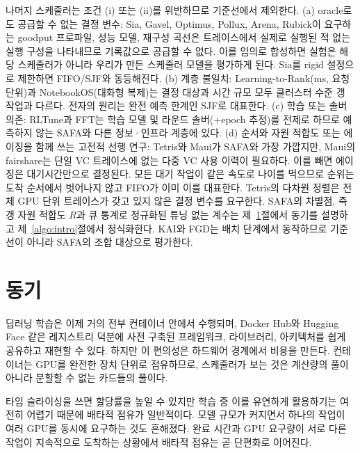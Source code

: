 \documentclass{ieeetj}
\begin{document}
나머지 스케줄러는 조건 (i) 또는 (ii)를 위반하므로 기준선에서 제외한다. (a) oracle로도 공급할 수 없는 결정 변수: Sia, Gavel, Optimus, Pollux, Arena, Rubick이 요구하는 goodput 프로파일, 성능 모델, 재구성 곡선은 트레이스에서 실제로 실행된 적 없는 실행 구성을 나타내므로 기록값으로 공급할 수 없다. 이를 임의로 합성하면 실험은 해당 스케줄러가 아니라 우리가 만든 스케줄러 모델을 평가하게 된다. Sia를 rigid 설정으로 제한하면 FIFO/SJF와 동등해진다. (b) 계층 불일치: Learning-to-Rank(ms, 요청 단위)과 NotebookOS(대화형 복제)는 결정 대상과 시간 규모 모두 클러스터 수준 갱 작업과 다르다. 전자의 원리는 완전 예측 한계인 SJF로 대표한다. (c) 학습 또는 솔버 의존: RLTune과 FFT는 학습 모델 및 라운드 솔버($+$epoch 추정)를 전제로 하므로 예측하지 않는 SAFA와 다른 정보·인프라 계층에 있다. (d) 순서와 자원 적합도 또는 에이징을 함께 쓰는 고전적 선행 연구: Tetris\cite{grandl2014multi}와 Maui\cite{jackson2001maui}가 SAFA와 가장 가깝지만, Maui의 fairshare는 단일 VC 트레이스에 없는 다중 VC 사용 이력이 필요하다. 이를 빼면 에이징은 대기시간만으로 결정된다. 모든 대기 작업이 같은 속도로 나이를 먹으므로 순위는 도착 순서에서 벗어나지 않고 FIFO가 이미 이를 대표한다. Tetris의 다차원 정렬은 전체 GPU 단위 트레이스가 갖고 있지 않은 결정 변수를 요구한다. SAFA의 차별점, 즉 갱 자원 적합도 $R$과 큐 통계로 정규화된 튜닝 없는 계수는 제~\ref{motivation}절에서 동기를 설명하고 제~\ref{algo:intro}절에서 정식화한다. KAI와 FGD는 배치 단계에서 동작하므로 기준선이 아니라 SAFA의 조합 대상으로 평가한다.

\section{동기}\label{motivation}
딥러닝 학습은 이제 거의 전부 컨테이너 안에서 수행되며\cite{b7}, Docker Hub\cite{b8}와 Hugging Face\cite{b9} 같은 레지스트리 덕분에 사전 구축된 프레임워크, 라이브러리, 아키텍처를 쉽게 공유하고 재현할 수 있다. 하지만 이 편의성은 하드웨어 경계에서 비용을 만든다. 컨테이너는 GPU를 완전한 장치 단위로 점유하므로, 스케줄러가 보는 것은 계산량의 풀이 아니라 분할할 수 없는 카드들의 풀이다.

타임 슬라이싱을 쓰면 할당률을 높일 수 있지만 학습 중 이를 유연하게 활용하기는 여전히 어렵기 때문에 배타적 점유가 일반적이다. 모델 규모가 커지면서 하나의 작업이 여러 GPU를 동시에 요구하는 것도 흔해졌다. 완료 시간과 GPU 요구량이 서로 다른 작업이 지속적으로 도착하는 상황에서 배타적 점유는 곧 단편화로 이어진다.
\end{document}

